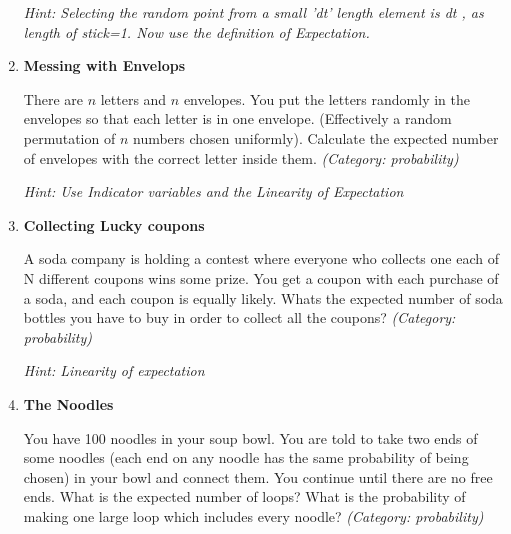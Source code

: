\begin{enumerate}
\small\emph{Hint: Selecting the random point from a small 'dt' length element is dt , as length of stick=1. Now use the definition of Expectation.}





\item \textbf{Messing with Envelops}

There are $n$ letters and $n$ envelopes. You put the letters randomly in the envelopes so that each letter is in one envelope. (Effectively a random permutation of $n$ numbers chosen uniformly). Calculate the expected number of envelopes with the correct letter inside them.
\small\emph{(Category: probability)}

\small\emph{Hint: Use Indicator variables and the Linearity of Expectation}





\item \textbf{Collecting Lucky coupons}

A soda company is holding a contest where everyone who collects one each of N different coupons wins some prize. You get a coupon with each purchase of a soda, and each coupon is equally likely. Whats the expected number of soda bottles you have to buy in order to collect all the coupons?
\small\emph{(Category: probability)}

\small\emph{Hint: Linearity of expectation}





\item \textbf{The Noodles}

You have 100 noodles in your soup bowl. You are told to take two ends of some noodles (each end on any noodle has the same probability of being chosen) in your bowl and connect them. You continue until there are no free ends. What is the expected number of loops? What is the probability of making one large loop which includes every noodle?
\small\emph{(Category: probability)}


\end{enumerate}
